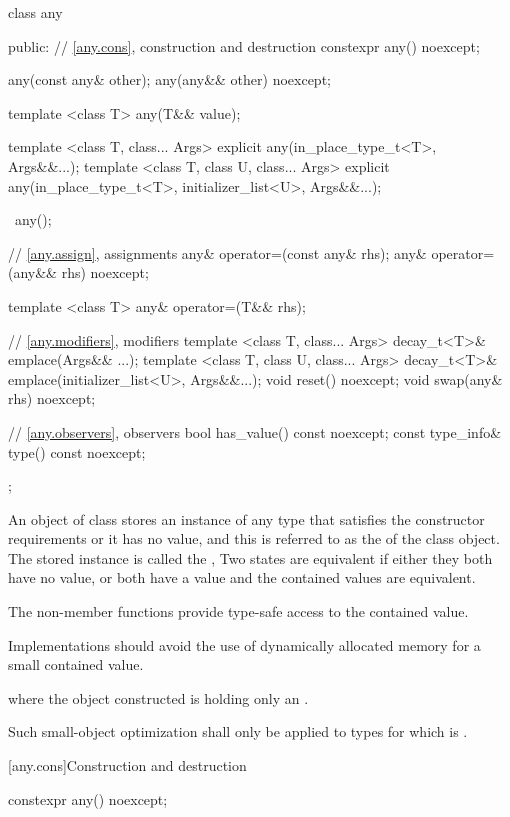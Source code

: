 \begin{codeblock}
class any {
public:
  // \ref{any.cons}, construction and destruction
  constexpr any() noexcept;

  any(const any& other);
  any(any&& other) noexcept;

  template <class T> any(T&& value);

  template <class T, class... Args>
    explicit any(in_place_type_t<T>, Args&&...);
  template <class T, class U, class... Args>
    explicit any(in_place_type_t<T>, initializer_list<U>, Args&&...);

  ~any();

  // \ref{any.assign}, assignments
  any& operator=(const any& rhs);
  any& operator=(any&& rhs) noexcept;

  template <class T> any& operator=(T&& rhs);

  // \ref{any.modifiers}, modifiers
  template <class T, class... Args>
    decay_t<T>& emplace(Args&& ...);
  template <class T, class U, class... Args>
    decay_t<T>& emplace(initializer_list<U>, Args&&...);
  void reset() noexcept;
  void swap(any& rhs) noexcept;

  // \ref{any.observers}, observers
  bool has_value() const noexcept;
  const type_info& type() const noexcept;
};
\end{codeblock}

\pnum
An object of class  stores an instance of any type that satisfies the constructor requirements or it has no value,
and this is referred to as the  of the class  object.
The stored instance is called the ,
Two states are equivalent if either they both have no value, or both have a value and the contained values are equivalent.

\pnum
The non-member  functions provide type-safe access to the contained value.

\pnum
Implementations should avoid the use of dynamically allocated memory for a small contained value.
\begin{example}
where the object constructed is holding only an .
\end{example}
Such small-object optimization shall only be applied to types  for which
 is .

[any.cons]{Construction and destruction}

%
\begin{itemdecl}
constexpr any() noexcept;
\end{itemdecl}

